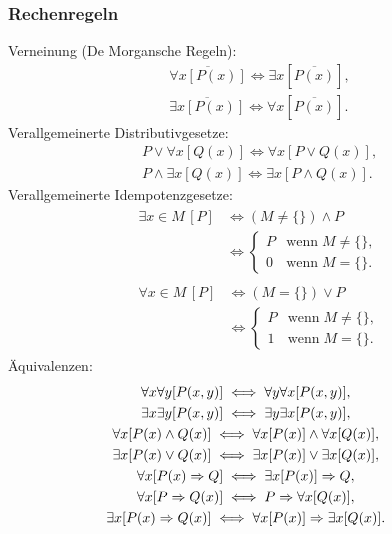 \subsubsection{Rechenregeln}
Verneinung (De Morgansche Regeln):
\begin{gather}
\overline{\forall x[P(x)]}\iff \exists x[\overline{P(x)}],\\
\overline{\exists x[P(x)]}\iff \forall x[\overline{P(x)}].
\end{gather}
Verallgemeinerte Distributivgesetze:
\begin{gather}
P\lor\forall x[Q(x)] \iff \forall x[P\lor Q(x)],\\
P\land\exists x[Q(x)] \iff \exists x[P\land Q(x)].
\end{gather}
Verallgemeinerte Idempotenzgesetze:
\begin{gather}
\begin{split}
\exists x{\in}M\,[P] & \iff
(M\ne\{\})\land P\\
& \iff\begin{cases}
P & \text{wenn}\; M\ne\{\},\\
0 & \text{wenn}\; M=\{\}.
\end{cases}
\end{split}\\
\begin{split}
\forall x{\in}M\,[P]& \iff
(M=\{\})\lor P\\
&\iff\begin{cases}
P & \text{wenn}\; M\ne\{\},\\
1 & \text{wenn}\; M=\{\}.
\end{cases}
\end{split}
\end{gather}
Äquivalenzen:
\begin{gather}
\hspace{-2em}\forall x\forall y[P(x,y)] \iff \forall y\forall x[P(x,y)],\\
\hspace{-2em}\exists x\exists y[P(x,y)] \iff \exists y\exists x[P(x,y)],\\
\hspace{-2em}\forall x[P(x)\land Q(x)] \iff \forall x[P(x)]\land\forall x[Q(x)],\\
\hspace{-2em}\exists x[P(x)\lor Q(x)] \iff \exists x[P(x)]\lor\exists x[Q(x)],\\
\hspace{-2em}\forall x[P(x)\Rightarrow Q] \iff \exists x[P(x)]\Rightarrow Q,\\
\hspace{-2em}\forall x[P\Rightarrow Q(x)] \iff P\Rightarrow\forall x[Q(x)],\\
\hspace{-2em}\exists x[P(x)\Rightarrow Q(x)]
  \iff\forall x[P(x)]\Rightarrow\exists x[Q(x)].
\end{gather}
